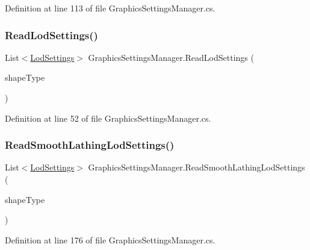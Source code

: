 Definition at line 113 of file Graphics\+Settings\+Manager.\+cs.

\mbox{\label{class_graphics_settings_manager_a6883354bfc01606cf75d70e067d0a28d}} 
\subsubsection{\texorpdfstring{ReadLodSettings()}{ReadLodSettings()}}
{\footnotesize\ttfamily List$<$\mbox{\hyperlink{class_lod_settings}{Lod\+Settings}}$>$ Graphics\+Settings\+Manager.\+Read\+Lod\+Settings (\begin{DoxyParamCaption}\item[{\mbox{\hyperlink{_shape_types_8cs_af0e24915ca1b4c216da56b86a5f3de13}{Shape\+Types}}}]{shape\+Type }\end{DoxyParamCaption})}



Definition at line 52 of file Graphics\+Settings\+Manager.\+cs.

\mbox{\label{class_graphics_settings_manager_a5eb8cc166509d6efe01f2cd3683b7766}} 
\subsubsection{\texorpdfstring{ReadSmoothLathingLodSettings()}{ReadSmoothLathingLodSettings()}}
{\footnotesize\ttfamily List$<$\mbox{\hyperlink{class_lod_settings}{Lod\+Settings}}$>$ Graphics\+Settings\+Manager.\+Read\+Smooth\+Lathing\+Lod\+Settings (\begin{DoxyParamCaption}\item[{\mbox{\hyperlink{_shape_types_8cs_af0e24915ca1b4c216da56b86a5f3de13}{Shape\+Types}}}]{shape\+Type }\end{DoxyParamCaption})}



Definition at line 176 of file Graphics\+Settings\+Manager.\+cs.

\mbox{\label{class_graphics_settings_manager_acd5f867b4893c148f46b267901130ce0}} 
